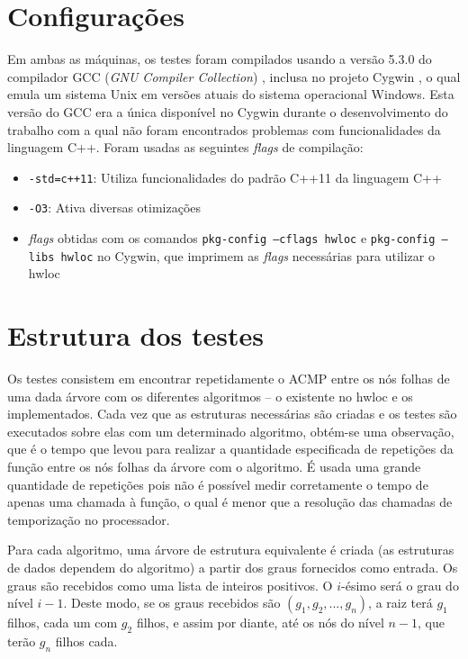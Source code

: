 \section{Configurações}

Em ambas as máquinas, os testes foram compilados usando a versão 5.3.0 do compilador GCC (\textit{GNU Compiler Collection}) \cite{gcc}, inclusa no projeto Cygwin \cite{cygwin}, o qual emula um sistema Unix em versões atuais do sistema operacional Windows.
Esta versão do GCC era a única disponível no Cygwin durante o desenvolvimento do trabalho com a qual não foram encontrados problemas com funcionalidades da linguagem C++.
Foram usadas as seguintes \textit{flags} de compilação:
\begin{itemize}
	\item \texttt{-std=c++11}: Utiliza funcionalidades do padrão C++11 da linguagem C++
	\item \texttt{-O3}: Ativa diversas otimizações
	\item \textit{flags} obtidas com os comandos \texttt{pkg-config --cflags hwloc} e \texttt{pkg-config --libs hwloc} no Cygwin, que imprimem as \textit{flags} necessárias para utilizar o hwloc
\end{itemize}
%


\section{Estrutura dos testes}

Os testes consistem em encontrar repetidamente o ACMP entre os nós folhas de uma dada árvore com os diferentes algoritmos -- o existente no hwloc e os implementados.
Cada vez que as estruturas necessárias são criadas e os testes são executados sobre elas com um determinado algoritmo, obtém-se uma observação, que é o tempo que levou para realizar a quantidade especificada de repetições da função \fACMP entre os nós folhas da árvore com o algoritmo.
É usada uma grande quantidade de repetições pois não é possível medir corretamente o tempo de apenas uma chamada à função, o qual é menor que a resolução das chamadas de temporização no processador.

Para cada algoritmo, uma árvore de estrutura equivalente é criada (as estruturas de dados dependem do algoritmo) a partir dos graus fornecidos como entrada.
Os graus são recebidos como uma lista de inteiros positivos.
O $i$-ésimo será o grau do nível $i-1$.
Deste modo, se os graus recebidos são $(g_1, g_2, ..., g_n)$, a raiz terá $g_1$ filhos, cada um com $g_2$ filhos, e assim por diante, até os nós do nível $n-1$, que terão $g_n$ filhos cada.

